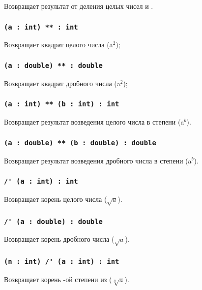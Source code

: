 Возвращает результат от деления целых чисел  и .


\subsubsection{\lstinline|(a : int) ** : int|}

Возвращает квадрат целого числа  (a$^2$);

\subsubsection{\lstinline|(a : double) ** : double|}

Возвращает квадрат дробного числа  (a$^2$);

\subsubsection{\lstinline|(a : int) ** (b : int) : int|}

Возвращает результат возведения целого числа  в степени  (a$^b$).

\subsubsection{\lstinline|(a : double) ** (b : double) : double|}

Возвращает результат возведения дробного числа  в степени  (a$^b$).

\subsubsection{\lstinline|/' (a : int) : int|}

Возвращает корень целого числа  ($\sqrt{a}$).

\subsubsection{\lstinline|/' (a : double) : double|}

Возвращает корень дробного числа  ($\sqrt{a}$).

\subsubsection{\lstinline|(n : int) /' (a : int) : int|}

Возвращает корень -ой степени из  ($\sqrt[n]{a}$).

